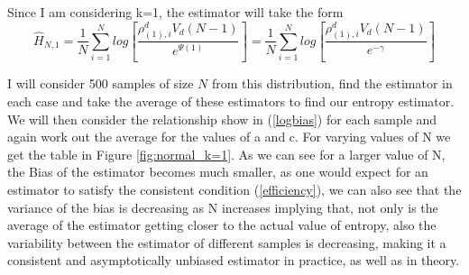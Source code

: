 \documentclass{article}
\begin{document}
Since I am considering k=1, the estimator will take the form
\begin{equation}
\hat{H}_{N, 1} = \frac{1}{N} \sum_{i=1}^{N} log \left[ \frac{\rho_{(1),i}^{d} V_{d} (N-1)}{e^{\Psi(1)}} \right] = \frac{1}{N} \sum_{i=1}^{N} log \left[ \frac{\rho_{(1),i}^{d} V_{d} (N-1)}{e^{-\gamma}} \right]
\end{equation}

I will consider 500 samples of size $N$ from this distribution, find the estimator in each case and take the average of these estimators to find our entropy estimator. We will then consider the relationship show in (\ref{logbias}) for each sample and again work out the average for the values of a and c. For varying values of N we get the table in Figure \ref{fig:normal_k=1}. As we can see for a larger value of N, the Bias of the estimator becomes much smaller, as one would expect for an estimator to satisfy the consistent condition (\ref{efficiency}), we can also see that the variance of the bias is decreasing as N increases implying that, not only is the average of the estimator getting closer to the actual value of entropy,  also the variability between the estimator of different samples is decreasing, making it a consistent and asymptotically unbiased estimator in practice, as well as in theory.
\end{document}
